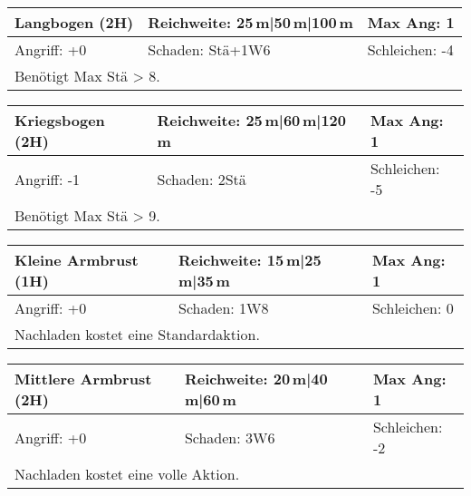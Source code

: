 \documentclass[../../Heldenanleitung2]{subfiles}
\begin{document}
\begin{tabular}{|p{}|p{}|p{}|}
\hline
\textbf{Langbogen (2H)} & Reichweite: 25\,m|50\,m|100\,m & Max Ang: 1\\
\hline
Angriff: +0 & Schaden: Stä+1W6 & Schleichen: -4\\
\hline
\multicolumn{3}{|p{0.99\textwidth}|}{Benötigt Max Stä > 8.} \\
\hline
\end{tabular}
\newline \newline\newline
\begin{tabular}{|p{}|p{}|p{}|}
\hline
\textbf{Kriegsbogen (2H)} & Reichweite: 25\,m|60\,m|120\,m & Max Ang: 1\\
\hline
Angriff: -1 & Schaden: 2Stä & Schleichen: -5\\
\hline
\multicolumn{3}{|p{0.99\textwidth}|}{Benötigt Max Stä > 9.} \\
\hline
\end{tabular}
\newline \newline\newline
\begin{tabular}{|p{}|p{}|p{}|}
\hline
\textbf{Kleine Armbrust (1H)} & Reichweite: 15\,m|25\,m|35\,m & Max Ang: 1 \\
\hline
Angriff: +0 & Schaden: 1W8 & Schleichen: 0\\
\hline
\multicolumn{3}{|p{0.99\textwidth}|}{Nachladen kostet eine Standardaktion.} \\
\hline
\end{tabular}
\newline \newline\newline
\begin{tabular}{|p{}|p{}|p{}|}
\hline
\textbf{Mittlere Armbrust (2H)} & Reichweite: 20\,m|40\,m|60\,m & Max Ang: 1\\
\hline
Angriff: +0 & Schaden: 3W6 & Schleichen: -2\\
\hline
\multicolumn{3}{|p{0.99\textwidth}|}{Nachladen kostet eine volle Aktion.} \\
\hline
\end{tabular}
\newline \newline\newline
\end{document}
